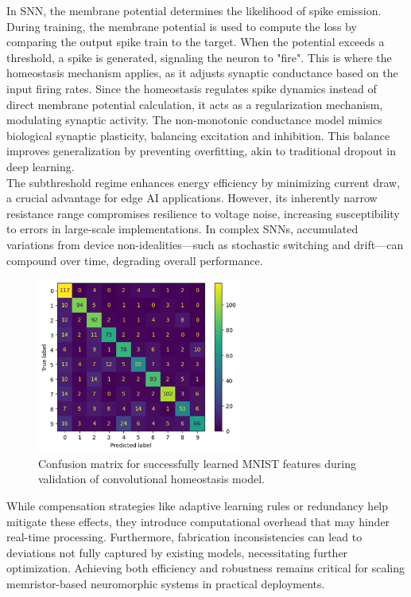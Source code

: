 \noindent In SNN, the membrane potential determines the likelihood of spike emission. During training, the membrane potential is used to compute the loss by comparing the output spike train to the target. When the potential exceeds a threshold, a spike is generated, signaling the neuron to "fire". This is where the homeostasis mechanism applies, as it adjusts synaptic conductance based on the input firing rates. Since the homeostasis regulates spike dynamics instead of direct membrane potential calculation, it acts as a regularization mechanism, modulating synaptic activity. The non-monotonic conductance model mimics biological synaptic plasticity, balancing excitation and inhibition. This balance improves generalization by preventing overfitting, akin to traditional dropout in deep learning.\\

\noindent The subthreshold regime enhances energy efficiency by minimizing current draw, a crucial advantage for edge AI applications. However, its inherently narrow resistance range compromises resilience to voltage noise, increasing susceptibility to errors in large-scale implementations. In complex SNNs, accumulated variations from device non-idealities—such as stochastic switching and drift—can compound over time, degrading overall performance. \\

\begin{figure}[!t]
    \centerline{\includegraphics[width=0.6\textwidth]{Chapter7/Figs/e.png}}
    \caption[Confusion matrix of convolutional homeostasis model.]{Confusion matrix for successfully learned MNIST features during validation of convolutional homeostasis model.}
    \label{fig:7e}
\end{figure}

\noindent While compensation strategies like adaptive learning rules or redundancy help mitigate these effects, they introduce computational overhead that may hinder real-time processing. Furthermore, fabrication inconsistencies can lead to deviations not fully captured by existing models, necessitating further optimization. Achieving both efficiency and robustness remains critical for scaling memristor-based neuromorphic systems in practical deployments.

